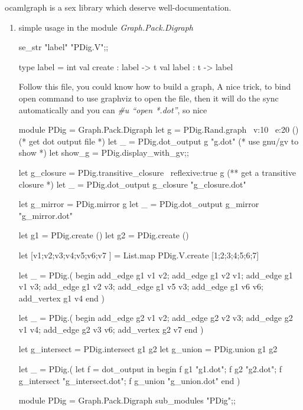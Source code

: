 
ocamlgraph is a sex library which deserve well-documentation.

\begin{enumerate}
\item simple usage in the module \textit{Graph.Pack.Digraph}

  \begin{redcode}
  se_str "label" "PDig.V";;
\end{redcode}

\begin{bluecode}
  type label = int
  val create : label -> t
  val label : t -> label    
\end{bluecode}

Follow this file, you could know how to build a graph,
A nice trick, to bind open command to use graphviz to open the 
file, then it will do the sync automatically 
and you can \textit{\#u ``open *.dot''}, so nice
\begin{bluecode}
module PDig = Graph.Pack.Digraph
let g = PDig.Rand.graph ~v:10 ~e:20 () 
(* get dot output file *)
let _ = PDig.dot_output g "g.dot" 
(* use gnu/gv to show *)
let show_g = PDig.display_with_gv;;

let g_closure = PDig.transitive_closure ~reflexive:true g 
(** get a transitive closure *)
let _ = PDig.dot_output g_closure "g_closure.dot"

let g_mirror = PDig.mirror g 
let _ = PDig.dot_output g_mirror "g_mirror.dot"

let g1 = PDig.create ()
let g2 = PDig.create ()


let [v1;v2;v3;v4;v5;v6;v7 ] = List.map PDig.V.create [1;2;3;4;5;6;7]

let _ = PDig.( begin
  add_edge g1 v1 v2;
  add_edge g1 v2 v1;
  add_edge g1 v1 v3;
  add_edge g1 v2 v3;
  add_edge g1 v5 v3;
  add_edge g1 v6 v6;
  add_vertex g1 v4
  end 
)

let _ = PDig.( begin
  add_edge g2 v1 v2;
  add_edge g2 v2 v3;
  add_edge g2 v1 v4;
  add_edge g2 v3 v6;
  add_vertex g2 v7
end
)

let g_intersect = PDig.intersect g1 g2 
let g_union = PDig.union g1 g2 

let _ = 
  PDig.(
    let f = dot_output in begin
    f g1 "g1.dot";
    f g2 "g2.dot";
    f g_intersect "g_intersect.dot"; 
    f g_union "g_union.dot"
    end 
  )
\end{bluecode}

  \begin{redcode}
module PDig = Graph.Pack.Digraph    
sub_modules "PDig";;    
\end{redcode}


\end{enumerate}
